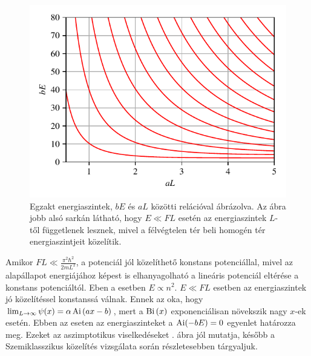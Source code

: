 \begin{figure}[H]
	\centering
	\includegraphics[scale=1]{./figs/energiaszintek.pdf}
	\caption[Egzakt energiaszintek]{Egzakt energiaszintek, $bE$ és $aL$ közötti relációval ábrázolva. Az ábra jobb alsó sarkán látható, hogy $E \ll FL$ esetén az energiaszintek $L$-től függetlenek lesznek, mivel a félvégtelen tér beli homogén tér energiaszintjeit közelítik.}
	\label{box_energiaszintek_abra}
\end{figure}
Amikor $FL \ll \frac{\pi^2\hbar^2}{2mL^2}$, a potenciál jól közelíthető konstans potenciállal, mivel az alapállapot energiájához képest is elhanyagolható a lineáris potenciál eltérése a konstans potenciáltól. Eben a esetben $E \propto n^2$. $E \ll FL$ esetben az energiaszintek jó közelítéssel konstanssá válnak. Ennek az oka, hogy $\lim_{L \to \infty}\psi(x) = \alpha \operatorname{Ai}\left(ax-b\right)$, mert a $\operatorname{Bi}\left(x\right)$ exponenciálisan növekszik nagy $x$-ek esetén. Ebben az eseten az energiaszinteket a $\operatorname{Ai}(-bE) = 0$ egyenlet határozza meg. Ezeket az aszimptotikus viselkedéseket . ábra jól mutatja, később a Szemiklasszikus közelítés vizsgálata során részletesebben tárgyaljuk.

